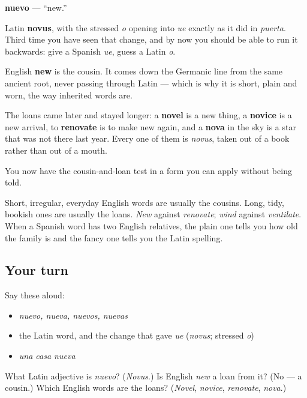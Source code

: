 \begin{cousinweb}
\textbf{nuevo} — \textquotedblleft{}new.\textquotedblright{}

Latin \textbf{novus}, with the stressed \emph{o} opening into \emph{ue} exactly as it did in \emph{puerta}. Third time you have seen that change, and by now you should be able to run it backwards: give a Spanish \emph{ue}, guess a Latin \emph{o}.

English \textbf{new} is the cousin. It comes down the Germanic line from the same ancient root, never passing through Latin — which is why it is short, plain and worn, the way inherited words are.

The loans came later and stayed longer: a \textbf{novel} is a new thing, a \textbf{novice} is a new arrival, to \textbf{renovate} is to make new again, and a \textbf{nova} in the sky is a star that was not there last year. Every one of them is \emph{novus}, taken out of a book rather than out of a mouth.
\end{cousinweb}

\begin{grammarlens}[title={What you've built}]
You now have the cousin-and-loan test in a form you can apply without being told.

Short, irregular, everyday English words are usually the cousins. Long, tidy, bookish ones are usually the loans. \emph{New} against \emph{renovate}; \emph{wind} against \emph{ventilate}. When a Spanish word has two English relatives, the plain one tells you how old the family is and the fancy one tells you the Latin spelling.
\end{grammarlens}

\subsection*{Your turn}
Say these aloud:

\begin{itemize}
\raggedright
  \item \emph{nuevo, nueva, nuevos, nuevas}
  \item the Latin word, and the change that gave \emph{ue} (\emph{novus}; stressed \emph{o})
  \item \emph{una casa nueva}
\end{itemize}

\begin{tcolorbox}[breakable,colback=teal!4,colframe=teal!35!black,title={Before you move on}]
What Latin adjective is \emph{nuevo}? (\emph{Novus}.) Is English \emph{new} a loan from it? (No — a cousin.) Which English words are the loans? (\emph{Novel}, \emph{novice}, \emph{renovate}, \emph{nova}.)
\end{tcolorbox}
